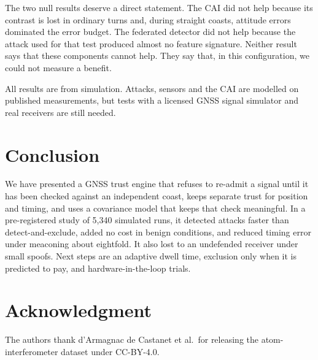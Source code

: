 \documentclass[conference]{IEEEtran}
\begin{document}
The two null results deserve a direct statement. The CAI did not help because its contrast is lost in ordinary turns and, during straight coasts, attitude errors dominated the error budget. The federated detector did not help because the attack used for that test produced almost no feature signature. Neither result says that these components cannot help. They say that, in this configuration, we could not measure a benefit.

All results are from simulation. Attacks, sensors and the CAI are modelled on published measurements, but tests with a licensed GNSS signal simulator and real receivers are still needed.

\section{Conclusion}

We have presented a GNSS trust engine that refuses to re-admit a signal until it has been checked against an independent coast, keeps separate trust for position and timing, and uses a covariance model that keeps that check meaningful. In a pre-registered study of 5{,}340 simulated runs, it detected attacks faster than detect-and-exclude, added no cost in benign conditions, and reduced timing error under meaconing about eightfold. It also lost to an undefended receiver under small spoofs. Next steps are an adaptive dwell time, exclusion only when it is predicted to pay, and hardware-in-the-loop trials.

\section*{Acknowledgment}
The authors thank d'Armagnac de Castanet et al.\ for releasing the atom-interferometer dataset under CC-BY-4.0.



\end{document}
